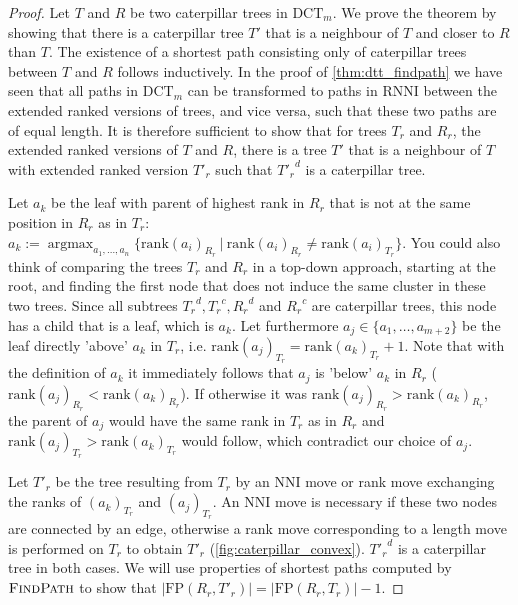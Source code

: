 \documentclass[11pt]{amsart}
\newcommand{\rnni}{\mathrm{RNNI}}
\newcommand{\findpath}{\textsc{FindPath}}
\newcommand{\rank}{\mathrm{rank}}
\newcommand{\nni}{\mathrm{NNI}}
\newcommand{\fp}{\mathrm{FP}}
\newcommand{\dct}{\mathrm{DCT}}
\DeclareMathOperator*{\argmax}{argmax}
\begin{document}
\begin{proof}
	Let $T$ and $R$ be two caterpillar trees in $\dct_m$.
	We prove the theorem by showing that there is a caterpillar tree $T'$ that is a neighbour of $T$ and closer to $R$ than $T$.
	The existence of a shortest path consisting only of caterpillar trees between $T$ and $R$ follows inductively.
	In the proof of \autoref{thm:dtt_findpath} we have seen that all paths in $\dct_m$ can be transformed to paths in $\rnni$ between the extended ranked versions of trees, and vice versa, such that these two paths are of equal length.
	It is therefore sufficient to show that for trees $T_r$ and $R_r$, the extended ranked versions of $T$ and $R$, there is a tree $T'$ that is a neighbour of $T$ with extended ranked version $T'_r$ such that ${T'_r}^d$ is a caterpillar tree.

	Let $a_k$ be the leaf with parent of highest rank in $R_r$ that is not at the same position in $R_r$ as in $T_r$: $a_k := \argmax_{a_1, \ldots, a_n}\{\rank(a_i)_{R_r} \ |\  \rank(a_i)_{R_r} \neq \rank(a_i)_{T_r}\}$.
	You could also think of comparing the trees $T_r$ and $R_r$ in a top-down approach, starting at the root, and finding the first node that does not induce the same cluster in these two trees.
	Since all subtrees ${T_r}^d, {T_r}^c, {R_r}^d$ and ${R_r}^c$ are caterpillar trees, this node has a child that is a leaf, which is $a_k$.
	Let furthermore $a_j \in \{a_1, \ldots, a_{m+2}\}$ be the leaf directly 'above' $a_k$ in $T_r$, i.e. $\rank(a_j)_{T_r} = \rank(a_k)_{T_r} + 1$.
	Note that with the definition of $a_k$ it immediately follows that $a_j$ is 'below' $a_k$ in $R_r$ ($\rank(a_j)_{R_r} < \rank(a_k)_{R_r}$).
	If otherwise it was $\rank(a_j)_{R_r} > \rank(a_k)_{R_r}$, the parent of $a_j$ would have the same rank in $T_r$ as in $R_r$ and $\rank(a_j)_{T_r} > \rank(a_k)_{T_r}$ would follow, which contradict our choice of $a_j$.

	Let $T'_r$ be the tree resulting from $T_r$ by an $\nni$ move or rank move exchanging the ranks of $(a_k)_{T_r}$ and $(a_j)_{T_r}$.
	An $\nni$ move is necessary if these two nodes are connected by an edge, otherwise a rank move corresponding to a length move is performed on $T_r$ to obtain $T'_r$ (\autoref{fig:caterpillar_convex}).
	${T'_r}^d$ is a caterpillar tree in both cases.
	We will use properties of shortest paths computed by $\findpath$ to show that $|\fp(R_r,T'_r)| = |\fp(R_r,T_r)| - 1$.


\end{proof}
\end{document}
